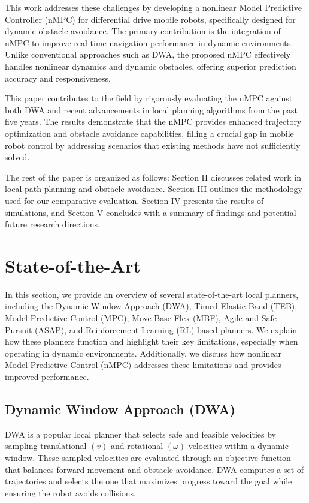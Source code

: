 \documentclass[conference]{IEEEtran}
\begin{document}
This work addresses these challenges by developing a nonlinear Model Predictive Controller (nMPC) for differential drive mobile robots, specifically designed for dynamic obstacle avoidance. The primary contribution is the integration of nMPC to improve real-time navigation performance in dynamic environments. Unlike conventional approaches such as DWA, the proposed nMPC effectively handles nonlinear dynamics and dynamic obstacles, offering superior prediction accuracy and responsiveness.

This paper contributes to the field by rigorously evaluating the nMPC against both DWA and recent advancements in local planning algorithms from the past five years. The results demonstrate that the nMPC provides enhanced trajectory optimization and obstacle avoidance capabilities, filling a crucial gap in mobile robot control by addressing scenarios that existing methods have not sufficiently solved.

The rest of the paper is organized as follows: Section II discusses related work in local path planning and obstacle avoidance. Section III outlines the methodology used for our comparative evaluation. Section IV presents the results of simulations, and Section V concludes with a summary of findings and potential future research directions.


\section{State-of-the-Art}

In this section, we provide an overview of several state-of-the-art local planners, including the Dynamic Window Approach (DWA), Timed Elastic Band (TEB), Model Predictive Control (MPC), Move Base Flex (MBF), Agile and Safe Pursuit (ASAP), and Reinforcement Learning (RL)-based planners. We explain how these planners function and highlight their key limitations, especially when operating in dynamic environments. Additionally, we discuss how nonlinear Model Predictive Control (nMPC) addresses these limitations and provides improved performance.

\subsection{Dynamic Window Approach (DWA)}
DWA is a popular local planner that selects safe and feasible velocities by sampling translational \((v)\) and rotational \((\omega)\) velocities within a dynamic window. These sampled velocities are evaluated through an objective function that balances forward movement and obstacle avoidance. DWA computes a set of trajectories and selects the one that maximizes progress toward the goal while ensuring the robot avoids collisions.
\end{document}
